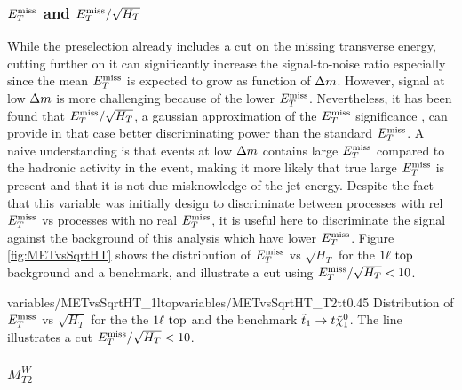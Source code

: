            \subsubsection{$E_T^\text{miss}$ and $E_T^\text{miss}/\sqrt{H_T}$}

        While the preselection already includes a cut on the missing transverse energy, 
        cutting further on it can significantly increase the signal-to-noise ratio especially
        since the mean $E_T^\text{miss}$ is expected to grow as function of $\Delta m$. However, signal
        at low $\Delta m$ is more challenging because of the lower $E_T^\text{miss}$. Nevertheless,
        it has been found that $E_T^\text{miss}/\sqrt{H_T}$, a gaussian approximation of the $E_T^\text{miss}$ 
        significance \cite{METsignificanceMirman, METperf}, can provide in that case better 
        discriminating power than the 
        standard $E_T^\text{miss}$. A naive understanding is that events at low $\Delta m$ contains 
        large $E_T^\text{miss}$ compared to the hadronic activity in the event, making it more likely
        that true large $E_T^\text{miss}$ is present and that it is not due misknowledge of the jet 
        energy. Despite the fact that this variable was initially design to discriminate
        between processes with rel $E_T^\text{miss}$ vs processes with no real $E_T^\text{miss}$, it is useful here
        to discriminate the signal against the background of this analysis which have lower
        $E_T^\text{miss}$. Figure \ref{fig:METvsSqrtHT} shows the distribution of $E_T^\text{miss}$ vs $\sqrt{H_T}$ 
        for the $1\ell~\text{top}$ background and a benchmark, and illustrate a cut using 
        $E_T^\text{miss} / \sqrt{H_T} < 10$.

                         {variables/METvsSqrtHT_1ltop}{variables/METvsSqrtHT_T2tt}{0.45}
                         {Distribution of $E_T^\text{miss}$ vs $\sqrt{H_T}$ for the the 
                         $1\ell~\text{top}$ and the benchmark $\tilde{t}_1 \rightarrow t \tilde{\chi}_1^0$.
                         The line illustrates a cut $E_T^\text{miss} / \sqrt{H_T} < 10$.}

        \subsubsection{$M_{T2}^{W}$}
        
